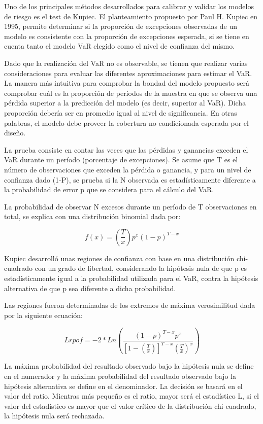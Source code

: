 \documentclass[
  12pt,
]{krantz}
\begin{document}
Uno de los principales métodos desarrollados para calibrar y validar los modelos de riesgo es el test de Kupiec. El planteamiento propuesto por Paul H. Kupiec en 1995, permite determinar si la proporción de excepciones observadas de un modelo es consistente con la proporción de excepciones esperada, si se tiene en cuenta tanto el modelo VaR elegido como el nivel de confianza del mismo.

Dado que la realización del VaR no es observable, se tienen que realizar varias consideraciones para evaluar las diferentes aproximaciones para estimar el VaR. La manera más intuitiva para comprobar la bondad del modelo propuesto será comprobar cuál es la proporción de períodos de la muestra en que se observa una pérdida superior a la predicción del modelo (es decir, superior al VaR). Dicha proporción debería ser en promedio igual al nivel de significancia. En otras palabras, el modelo debe proveer la cobertura no condicionada esperada por el diseño.

La prueba consiste en contar las veces que las pérdidas y ganancias exceden el VaR durante un período (porcentaje de excepciones). Se asume que T es el número de observaciones que exceden la pérdida o ganancia, y para un nivel de confianza dado (1-P), se prueba si la N observada es estadísticamente diferente a la probabilidad de error p que se considera para el cálculo del VaR.

La probabilidad de observar N excesos durante un período de T observaciones en total, se explica con una distribución binomial dada por:

\[f(x) = \left(\frac{T}{x}\right) p^{x}(1-p)^{T-x}\]

Kupiec desarrolló unas regiones de confianza con base en una distribución chi-cuadrado con un grado de libertad, considerando la hipótesis nula de que p es estadísticamente igual a la probabilidad utilizada para el VaR, contra la hipótesis alternativa de que p sea diferente a dicha probabilidad.

Las regiones fueron determinadas de los extremos de máxima verosimilitud dada por la siguiente ecuación:

\[Lrpof = -2* Ln(\frac{(1-p)^{T-x}p^{x}}{\left[1-\left(\frac{T}{x}\right)\right]^{T-x}\left(\frac{T}{x}\right)^{x}})\]

La máxima probabilidad del resultado observado bajo la hipótesis nula se define en el numerador y la máxima probabilidad del resultado observado bajo la hipótesis alternativa se define en el denominador. La decisión se basará en el valor del ratio. Mientras más pequeño es el ratio, mayor será el estadístico L, si el valor del estadístico es mayor que el valor crítico de la distribución chi-cuadrado, la hipótesis nula será rechazada.
\end{document}
